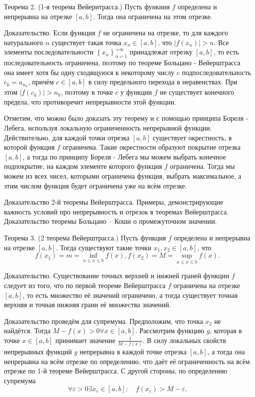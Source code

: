 Теорема 2. (1-я теорема Вейеритрасса.) Пусть функиия $f$ определена и непрерывна на отрезке $[a, b]$. Тогда она ограничена на этом отрезке.

Доказательство. Если функция $f$ не ограничена на отрезке, то для каждого натурального $n$ существует такая точка $x_n \in[a, b]$, что $\left|f\left(x_n\right)\right|>n$. Все элементы последовательности $\left\{x_n\right\}_{n=1}^{+\infty}$ принадлежат отрезку $[a, b]$, то есть последовательность ограничена, поэтому по теореме Больцано - Вейерштрасса она имеет хотя бы одну сходящуюся к некоторому числу $c$ подпоследовательность $c_k=a_{n_k}$, причём $c \in[a, b]$ в силу предельного перехода в неравенствах. При этом $\left|f\left(c_k\right)\right|>n_k$, поэтому в точке $c$ у функции $f$ не существует конечного предела, что противоречит непрерывности этой функции.

Отметим, что можно было доказать эту теорему и с помощью принципа Бореля - Лебега, используя локальную ограниченность непрерывной функции. Действительно, для каждой точки отрезка $[a, b]$ существует окрестность, в которой функция $f$ ограничена. Такие окрестности образуют покрытие отрезка $[a, b]$, а тогда по принципу Бореля - Лебега мы можем выбрать конечное подпокрытие, на каждом элементе которого функция $f$ ограничена. Тогда мы можем из всех чисел, которыми ограничена функция, выбрать максимальное, а этим числом функция будет ограничена уже на всём отрезке.

\newpage
\begin{problem}
Доказательство 2-й теоремы Вейерштрасса. Примеры, демонстрирующие важность условий про непрерывность и отрезок в теоремах Вейерштрасса. Доказательство теоремы
Больцано – Коши о промежуточном значении.
\end{problem}
Теорема 3. (2 теорема Вейерштрасса.) Пусть функция $f$ определена и непрерывна
на отрезке $[a, b]$. Тогда существуют такие точки $x_1, x_2 \in[a, b]$, что
$$
f\left(x_1\right)=m=\inf _{a \leq x \leq b} f(x), f\left(x_2\right)=M=\sup _{a \leq x \leq b} f(x) .
$$

Доказательство. Существование точных верхней и нижней граней функции $f$ следует из того, что по первой теореме Вейерштрасса $f$ ограничена на отрезке $[a, b]$, то есть множество её значений ограничено, а тогда существует точная верхняя и точная нижняя грани её множества значений.

Доказательство проведём для супремума. Предположим, что точка $x_2$ не найдётся. Тогда $M-f(x)>0 \forall x \in[a, b]$. Рассмотрим функцию $g$, которая в точке $x \in[a, b]$ принимает значение $\frac{1}{M-f(x)}$. В силу локальных свойств непрерывных функций $g$ непрерывна в каждой точке отрезка $[a, b]$, а тогда она непрерывна на всём отрезке по определению, что даёт её ограниченность на всём отрезке по 1-й теореме Вейерштрасса. С другой стороны, по определению супремума
$$
\forall \varepsilon>0 \exists x_{\varepsilon} \in[a, b]: \quad f\left(x_{\varepsilon}\right)>M-\varepsilon .
$$

